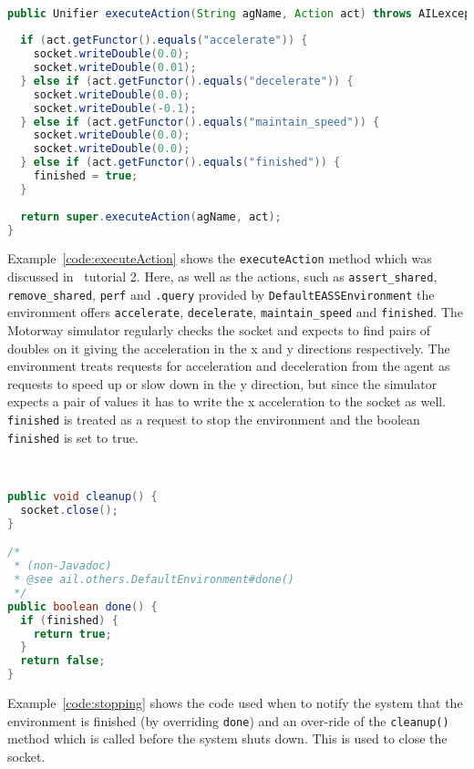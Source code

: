 \begin{ourexample}
\label{code:executeAction} \quad \\
\begin{lstlisting}[basicstyle=\sffamily,language=Java,style=easslisting]
public Unifier executeAction(String agName, Action act) throws AILexception {
		
  if (act.getFunctor().equals("accelerate")) {
    socket.writeDouble(0.0);
    socket.writeDouble(0.01);
  } else if (act.getFunctor().equals("decelerate")) {
    socket.writeDouble(0.0);
    socket.writeDouble(-0.1);
  } else if (act.getFunctor().equals("maintain_speed")) {
    socket.writeDouble(0.0);
    socket.writeDouble(0.0);
  } else if (act.getFunctor().equals("finished")) {
    finished = true;
  }
		
  return super.executeAction(agName, act);
}
\end{lstlisting}
\end{ourexample}
Example~\ref{code:executeAction} shows the \texttt{executeAction} method which was discussed in \ail\ tutorial 2.  Here, as well as the actions, such as \lstinline{assert_shared}, \lstinline{remove_shared}, \lstinline{perf} and \lstinline{.query} provided by \texttt{DefaultEASSEnvironment} the environment offers \lstinline{accelerate}, \lstinline{decelerate}, \lstinline{maintain_speed} and \lstinline{finished}.  The Motorway simulator regularly checks the socket and expects to find pairs of doubles on it giving the acceleration in the x and y directions respectively.  The environment treats requests for acceleration and deceleration from the agent as requests to speed up or slow down in the y direction, but since the simulator expects a pair of values it has to write the x acceleration to the socket as well.  \lstinline{finished} is treated as a request to stop the environment and the boolean \texttt{finished} is set to true.

\begin{ourexample}
\label{code:stopping} \quad \\
\begin{lstlisting}[basicstyle=\sffamily,language=Java,style=easslisting]
public void cleanup() {
  socket.close();
}

/*
 * (non-Javadoc)
 * @see ail.others.DefaultEnvironment#done()
 */
public boolean done() {
  if (finished) {
    return true;
  }
  return false;
}
\end{lstlisting}
\end{ourexample}
Example~\ref{code:stopping} shows the code used when to notify the system that the environment is finished (by overriding \texttt{done}) and an over-ride of the \texttt{cleanup()} method which is called before the system shuts down.  This is used to close the socket.

